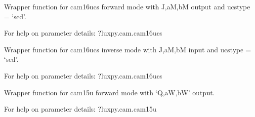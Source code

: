 \documentclass[letterpaper,10pt,english]{sphinxmanual}
\begin{document}

\begin{fulllineitems}
\label{\detokenize{color:luxpy.color.cam.xyz_to_jab_cam16scd}}
Wrapper function for cam16ucs forward mode with J,aM,bM output and ucstype = ‘scd’.

\begin{DUlineblock}{0em}
\item[] For help on parameter details: ?luxpy.cam.cam16ucs 
\end{DUlineblock}

\end{fulllineitems}


\begin{fulllineitems}
\label{\detokenize{color:luxpy.color.cam.jab_cam16scd_to_xyz}}
Wrapper function for cam16ucs inverse mode with J,aM,bM input  and ucstype = ‘scd’.

\begin{DUlineblock}{0em}
\item[] For help on parameter details: ?luxpy.cam.cam16ucs 
\end{DUlineblock}

\end{fulllineitems}


\begin{fulllineitems}
\label{\detokenize{color:luxpy.color.cam.xyz_to_qabW_cam15u}}
Wrapper function for cam15u forward mode with ‘Q,aW,bW’ output.

\begin{DUlineblock}{0em}
\item[] For help on parameter details: ?luxpy.cam.cam15u
\end{DUlineblock}

\end{fulllineitems}
\end{document}
